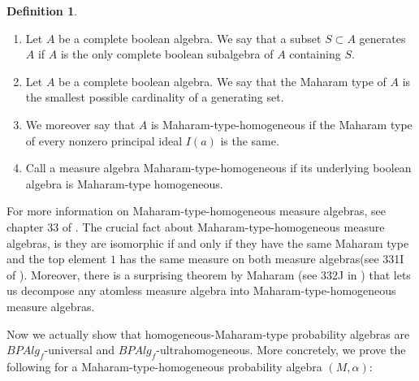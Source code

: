 \documentclass[a4paper]{amsproc}
\theoremstyle{plain}
\theoremstyle{definition}
\newtheorem{definition}[theorem]{Definition}
\theoremstyle{remark}
\numberwithin{equation}{section}
\begin{document}
\begin{definition} \label{maharam_type_homogeneous}
\begin{enumerate}
\item Let $A$ be a complete boolean algebra. We say that a subset $S \subset A$ generates $A$ if $A$ is the only complete boolean subalgebra of $A$ containing $S$.
\item Let $A$ be a complete boolean algebra. We say that the Maharam type of $A$ is the smallest possible cardinality of a generating set.
\item We moreover say that $A$ is Maharam-type-homogeneous if the Maharam type of every nonzero principal ideal $I(a)$ is the same.
\item Call a measure algebra Maharam-type-homogeneous if its underlying boolean algebra is Maharam-type homogeneous.
\end{enumerate}
\end{definition}

For more information on Maharam-type-homogeneous measure algebras, see chapter 33 of \cite{fremlin}. The crucial fact about Maharam-type-homogeneous measure algebras, is they are isomorphic if and only if they have the same Maharam type and the top element $1$ has the same measure on both measure algebras(see 331I of \cite{fremlin}). Moreover, there is a surprising theorem by Maharam (see 332J in \cite{fremlin}) that lets us decompose any atomless measure algebra into Maharam-type-homogeneous measure algebras.

Now we actually show that homogeneous-Maharam-type probability algebras are $BPAlg_f$-universal and $BPAlg_f$-ultrahomogeneous. More concretely, we prove the following for a Maharam-type-homogeneous probability algebra $(M, \alpha)$:
\end{document}
